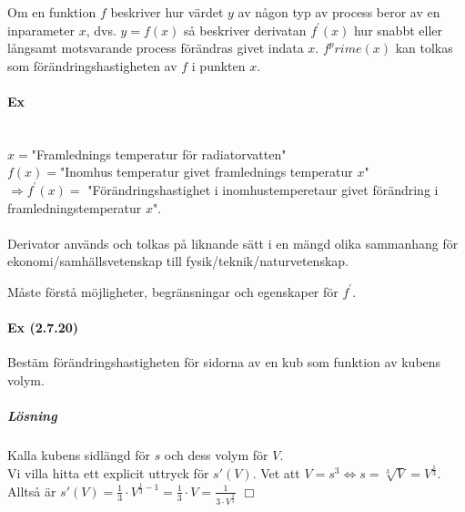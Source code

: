 Om en funktion $f$ beskriver hur värdet $y$ av någon typ av process beror av en inparameter $x$,
dvs. $y=f(x)$ så beskriver derivatan $f^\prime(x)$ hur snabbt eller långsamt motsvarande process förändras givet indata $x$.
$f^prime(x)$ kan tolkas som förändringshastigheten av $f$ i punkten $x$.

\paragraph{Ex}~\\
$x=$"Framlednings temperatur för radiatorvatten"\\
$f(x)=$"Inomhus temperatur givet framlednings temperatur $x$"\\
$\Rightarrow f^\prime(x)=$ "Förändringshastighet i inomhustemperetaur givet förändring i framledningstemperatur $x$".\\
\\Derivator används och tolkas på liknande sätt i en mängd olika sammanhang för ekonomi/samhällsvetenskap till fysik/teknik/naturvetenskap.

Måste förstå möjligheter, begränsningar och egenskaper för $f^\prime$.

\paragraph{Ex (2.7.20)} Bestäm förändringshastigheten för sidorna av en kub som funktion av kubens volym.
\subparagraph{Lösning} Kalla kubens sidlängd för $s$ och dess volym för $V$.\\
Vi villa hitta ett explicit uttryck för $s'(V)$.
Vet att $V=s^3\Leftrightarrow s=\sqrt[3]{V}=V^\frac{1}{3}$.
Alltså är $s'(V)=\frac{1}{3}\cdot V^{\frac{1}{3}-1}=\frac{1}{3}\cdot V=\frac{1}{3\cdot V^{\frac{2}{3}}}$ $\Box$

